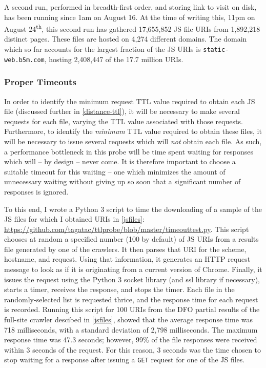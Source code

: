 A second run, performed in breadth-first order, and storing link to visit on disk, has been running since 1am on August 16.
At the time of writing this, 11pm on August 24\textsuperscript{th}, this second run has gathered 17,655,852 JS file URIs from 1,892,218 distinct pages.
These files are hosted on 4,274 different domains.
The domain which so far accounts for the largest fraction of the JS URIs is \texttt{static-web.b5m.com}, hosting 2,408,447 of the 17.7 million URIs.
\subsubsection{Proper Timeouts}
In order to identify the minimum request TTL value required to obtain each JS file (discussed further in \autoref{distance-ttl}), it will be necessary to make several requests for each file, varying the TTL value associated with those requests.
Furthermore, to identify the \textit{minimum} TTL value required to obtain these files, it will be necessary to issue several requests which will \textit{not} obtain each file.
As such, a performance bottleneck in this probe will be time spent waiting for responses which will -- by design -- never come.
It is therefore important to choose a suitable timeout for this waiting -- one which minimizes the amount of unnecessary waiting without giving up so soon that a significant number of responses is ignored.

To this end, I wrote a Python 3 script to time the downloading of a sample of the JS files for which I obtained URIs in \autoref{jsfiles}: \url{https://github.com/tagatac/ttlprobe/blob/master/timeouttest.py}.
This script chooses at random a specified number (100 by default) of JS URIs from a results file generated by one of the crawlers.
It then parses that URI for the scheme, hostname, and request.
Using that information, it generates an HTTP request message to look as if it is originating from a current version of Chrome.
Finally, it issues the request using the Python 3 socket library (and ssl library if necessary), starts a timer, receives the response, and stops the timer.
Each file in the randomly-selected list is requested thrice, and the response time for each request is recorded.
Running this script for 100 URIs from the DFO partial results of the full-site crawler descibed in \autoref{jsfiles}, showed that the average response time was 718 milliseconds, with a standard deviation of 2,798 milliseconds.
The maximum response time was 47.3 seconds; however, 99\% of the file responses were received within 3 seconds of the request.
For this reason, 3 seconds was the time chosen to stop waiting for a response after issuing a \texttt{GET} request for one of the JS files.
